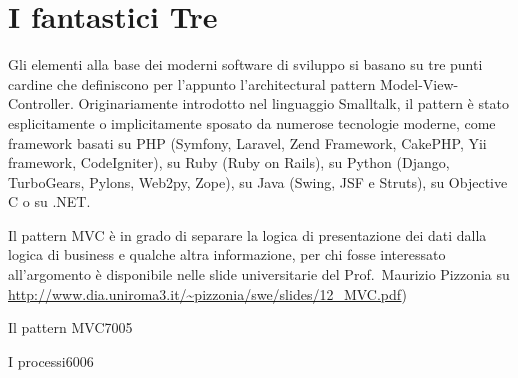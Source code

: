\chapter{I fantastici Tre}
\label{cap:fantastici}

Gli elementi alla base dei moderni software di sviluppo si basano su tre punti cardine che definiscono per l'appunto l'architectural pattern Model-View-Controller. Originariamente introdotto nel linguaggio Smalltalk, il pattern è stato esplicitamente o implicitamente sposato da numerose tecnologie moderne, come framework basati su PHP (Symfony, Laravel, Zend Framework, CakePHP, Yii framework, CodeIgniter), su Ruby (Ruby on Rails), su Python (Django, TurboGears, Pylons, Web2py, Zope), su Java (Swing, JSF e Struts), su Objective C o su .NET.

Il pattern MVC è in grado di separare la logica di presentazione dei dati dalla logica di business  e qualche altra informazione, per chi fosse interessato all'argomento è disponibile nelle slide universitarie del Prof.~Maurizio Pizzonia  su \url{http://www.dia.uniroma3.it/~pizzonia/swe/slides/12_MVC.pdf})

\begin{img}{Il pattern MVC}{7}{005}
\end{img}

\begin{img}{I processi}{6}{006}
\end{img}